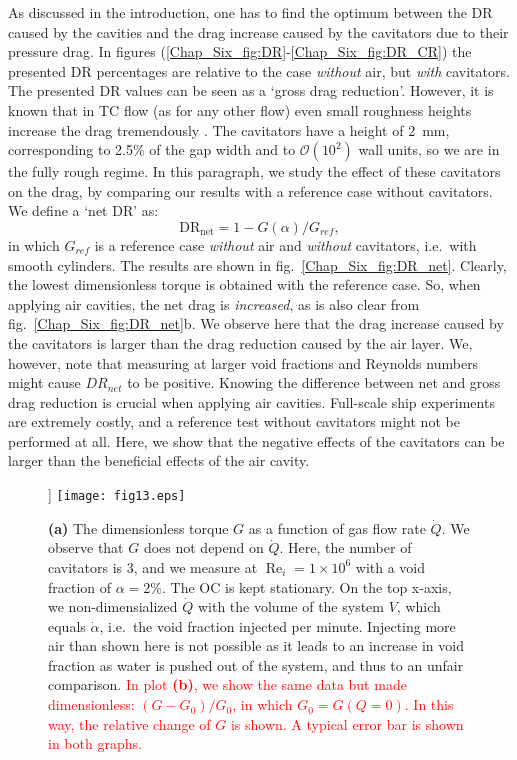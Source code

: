 \documentclass[aps,onecolumn,10pt, floatfix, superscriptaddress,longbibliography, pra]{revtex4-1}
\newcommand{\red}[1]{\textcolor{red}{#1}}
\renewcommand{\Re}{\operatorname{Re}}
\begin{document}
As discussed in the introduction, one has to find the optimum between the DR caused by the cavities and the drag increase caused by the cavitators due to their pressure drag. In figures (\ref{Chap_Six_fig:DR}-\ref{Chap_Six_fig:DR_CR}) the presented DR percentages are relative to the case {\it without} air, but {\it with} cavitators. The presented DR values can be seen as a `gross drag reduction'. However, it is known that in TC flow (as for any other flow) even small roughness heights increase the drag tremendously \citep{ber03,zhu18}. The cavitators have a height of 2~mm, corresponding to 2.5\% of the gap width and to $\mathcal{O}( 10^2)$ wall units, so we are in the fully rough regime. In this paragraph, we study the effect of  these cavitators on the drag, by comparing our results with a reference case without cavitators. We define a `net DR' as: 
\begin{equation}
\text{DR}_\text{net} = 1 - G(\alpha) / G_{ref},
\end{equation}
in which $G_{ref}$ is a reference case {\it without} air and {\it without} cavitators, i.e.\ with smooth cylinders. The results are shown in fig.\ \ref{Chap_Six_fig:DR_net}. Clearly, the lowest dimensionless torque is obtained with the reference case. So,  when applying air cavities, the net drag is {\it increased}, as is also clear from fig.\ \ref{Chap_Six_fig:DR_net}b. We observe here that the drag increase caused by the cavitators is larger than the drag reduction caused by the air layer. We, however, note that measuring at larger void fractions and Reynolds numbers might cause $DR_{net}$ to be positive. Knowing the difference between net and gross drag reduction is crucial when applying air cavities. Full-scale ship experiments are extremely costly, and a reference test without cavitators might not be performed at all. Here, we show that the negative effects of the cavitators can be larger than the beneficial effects of the air cavity.





\begin{figure}[htp]
\centering]
\texttt{[image: fig13.eps]}
\caption{{\bf (a)} The dimensionless torque $G$ as a function of gas flow rate $\dot{Q}$. We observe that $G$ does not depend on $\dot{Q}$. Here, the number of cavitators is 3, and we measure at $\Re_i=1\times 10^6$ with a void fraction of $\alpha=2\%$. The OC is kept stationary. On the top x-axis, we non-dimensialized $\dot{Q}$ with the volume of the system $V$, which equals $\dot{\alpha}$, i.e.\ the void fraction injected per minute. Injecting more air than shown here is not possible as it leads to an increase in void fraction as water is pushed out of the system, and thus to an unfair comparison. \red{In plot {\bf (b)}, we show the same data but made dimensionless: $(G-G_0)/G_0$, in which $G_0 = G(Q=0)$. In this way, the relative change of $G$ is shown. A typical error bar is shown in both graphs.}}
\label{Chap_Six_fig:DR_airinjection}
\end{figure} 
\end{document}
